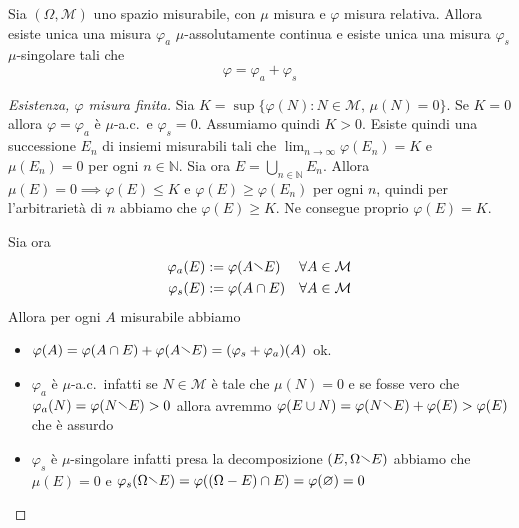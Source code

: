 \begin{theorem}
    Sia \((\Omega, \mathcal{M})\) uno spazio misurabile, con \(\mu\) misura e
    \(\varphi \) misura relativa. Allora esiste unica una misura \(\varphi_a\)
    \(\mu\)-assolutamente continua e esiste unica una misura \(\varphi_s\)
    \(\mu\)-singolare tali che
    \[
        \varphi = \varphi_a + \varphi_s
    \]
\end{theorem}
\begin{proof}[Esistenza, \(\varphi \) misura finita]
    Sia \(K = \sup \{ \varphi (N) : N \in \mathcal{M}, \, \mu(N) = 0\} \). Se
    \(K = 0\) allora \(\varphi =\varphi_a\) è \(\mu\)-a.c.~e \(\varphi_s = 0\).
    Assumiamo quindi \(K > 0\). Esiste quindi una successione \(E_{n}\) di
    insiemi misurabili tali che \(\lim_{n \to \infty} \varphi (E_{n}) = K\) e
    \(\mu(E_{n}) = 0\) per ogni \(n \in \mathbb{N}\). Sia ora \(E = \bigcup_{n
    \in \mathbb{N}} E_{n}\). Allora \(\mu(E) = 0 \implies \varphi (E) \le K\) e
    \(\varphi (E) \ge \varphi (E_{n})\) per ogni \(n\), quindi per
    l'arbitrarietà di \(n\) abbiamo che \(\varphi(E) \ge K\). Ne consegue
    proprio \(\varphi (E) = K\).

    Sia ora
    \begin{align*}
        \varphi_a(E) &:= \varphi (A \sminus E) &\forall A \in \mathcal{M} \\
        \varphi_s(E) &:= \varphi (A \cap E) &\forall A \in \mathcal{M}
    \end{align*}
    Allora per ogni \(A\) misurabile abbiamo
\begin{itemize}[label = --]
    \item \(\varphi(A) = \varphi (A \cap E) + \varphi (A \sminus E) = (\varphi_s
        + \varphi_a)(A)\) ok.
    \item \(\varphi_a\) è \(\mu\)-a.c.~infatti se \(N \in \mathcal{M}\) è tale
        che \(\mu(N) = 0\) e se fosse
        vero che \(\varphi_a(N) = \varphi (N \sminus E) > 0\) allora avremmo
        \(\varphi (E \cup N) = \varphi (N \sminus E) + \varphi (E) > \varphi
        (E)\) che è assurdo
    \item \(\varphi_s\) è \(\mu\)-singolare infatti presa la decomposizione
        \((E, \Omega \sminus E)\) abbiamo che \\ \(\mu(E) = 0\) e
        \(\varphi_s(\Omega \sminus E) = \varphi ((\Omega - E) \cap E) =
        \varphi(\varnothing) = 0\) 
\end{itemize}
\end{proof}
